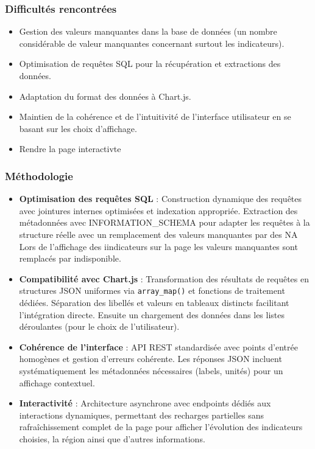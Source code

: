 \documentclass[11pt]{article}
\begin{document}
\subsubsection*{Difficultés rencontrées}
\begin{itemize}
    \item Gestion des valeurs manquantes dans la base de données (un nombre considérable de valeur manquantes concernant surtout les indicateurs).
    \item Optimisation de requêtes SQL pour la récupération et extractions des données.
    \item Adaptation du format des données à Chart.js.
    \item Maintien de la cohérence et de l’intuitivité de l’interface utilisateur en se basant sur les choix d'affichage.
    \item  Rendre la page interactivte
\end{itemize}

\subsubsection*{Méthodologie}
\begin{itemize}
    \item \textbf{Optimisation des requêtes SQL} : Construction dynamique des requêtes avec jointures internes optimisées et indexation appropriée. Extraction des métadonnées avec INFORMATION\_SCHEMA pour adapter les requêtes à la structure réelle avec un remplacement des valeurs manquantes par des NA Lors de l'affichage des iindicateurs sur la page les valeurs manquantes sont remplacés par indisponible.

\item \textbf{Compatibilité avec Chart.js} : Transformation des résultats de requêtes en structures JSON uniformes via \texttt{array\_map()} et fonctions de traitement dédiées. Séparation des libellés et valeurs en tableaux distincts  facilitant l'intégration directe. Ensuite un chargement des données dans les listes déroulantes (pour le choix de l'utilisateur).

\item \textbf{Cohérence de l'interface} : API REST standardisée avec points d'entrée homogènes et gestion d'erreurs cohérente. Les réponses JSON incluent systématiquement les métadonnées nécessaires (labels, unités) pour un affichage contextuel.

\item \textbf{Interactivité} : Architecture asynchrone avec endpoints dédiés aux interactions dynamiques, permettant des recharges partielles sans rafraîchissement complet de la page pour afficher l'évolution des indicateurs choisies, la région ainsi que d'autres informations. 
\end{itemize}
\end{document}
